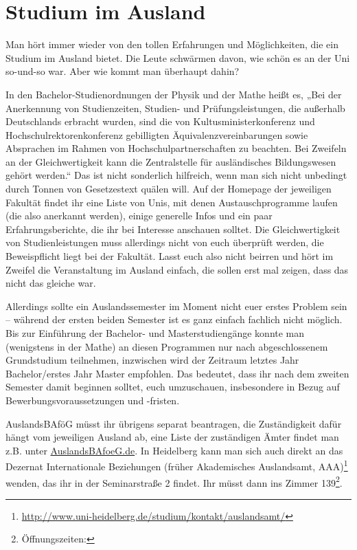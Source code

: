 \section{Studium im Ausland}
Man hört immer wieder von den tollen Erfahrungen und Möglichkeiten, die ein Studium im Ausland bietet. Die Leute schwärmen davon, wie schön es an der Uni so-und-so war. Aber wie kommt man überhaupt dahin?

In den Bachelor-Studienordnungen der Physik und der Mathe heißt es, „Bei der Anerkennung von Studienzeiten, Studien- und Prüfungsleistungen, die außerhalb Deutschlands erbracht wurden, sind die von Kultusministerkonferenz und Hochschulrektorenkonferenz gebilligten Äquivalenzvereinbarungen sowie Absprachen im Rahmen von Hochschulpartnerschaften zu beachten. Bei Zweifeln an der Gleichwertigkeit kann die Zentralstelle für ausländisches Bildungswesen gehört werden.“ Das ist nicht sonderlich hilfreich, wenn man sich nicht unbedingt durch Tonnen von Gesetzestext quälen will. Auf der Homepage der jeweiligen Fakultät findet ihr eine Liste von Unis, mit denen Austauschprogramme laufen (die also anerkannt werden), einige generelle Infos und ein paar Erfahrungsberichte, die ihr bei Interesse anschauen solltet. Die Gleichwertigkeit von Studienleistungen muss allerdings nicht von euch überprüft werden, die Beweispflicht liegt bei der Fakultät. Lasst euch also nicht beirren und hört im Zweifel die Veranstaltung im Ausland einfach, die sollen erst mal zeigen, dass das nicht das gleiche war.

Allerdings sollte ein Auslandssemester im Moment nicht euer erstes Problem sein -- während der ersten beiden Semester ist es ganz einfach fachlich nicht möglich. Bis zur Einführung der Bachelor- und Masterstudiengänge konnte man (wenigstens in der Mathe) an diesen Programmen nur nach abgeschlossenem Grundstudium teilnehmen, inzwischen wird der Zeitraum letztes Jahr Bachelor/erstes Jahr Master empfohlen. Das bedeutet, dass ihr nach dem zweiten Semester damit beginnen solltet, euch umzuschauen, insbesondere in Bezug auf Bewerbungsvoraussetzungen und -fristen.

AuslandsBAföG müsst ihr übrigens separat beantragen, die Zu\-stän\-dig\-keit dafür hängt vom jeweiligen Ausland ab, eine Liste der zuständigen Ämter findet man z.B. unter \url{AuslandsBAfoeG.de}. In Heidelberg kann man sich auch direkt an das Dezernat Internationale Beziehungen (früher Akademisches Auslandsamt, AAA)\footnote{\url{http://www.uni-heidelberg.de/studium/kontakt/auslandsamt/}} wenden, das ihr in der Seminarstraße 2 findet. Ihr müsst dann ins Zimmer 139\footnote{Öffnungszeiten: \auslandsinfooeff}.

